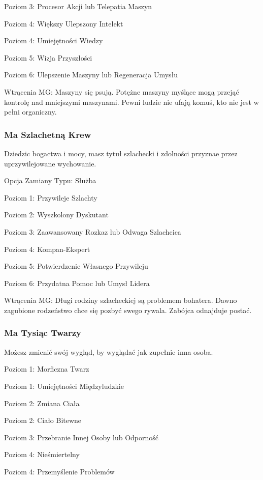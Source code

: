 Poziom 3: Procesor Akcji lub Telepatia Maszyn

Poziom 4: Większy Ulepszony Intelekt

Poziom 4: Umiejętności Wiedzy

Poziom 5: Wizja Przyszłości

Poziom 6: Ulepszenie Maszyny lub Regeneracja Umysłu

Wtrącenia MG: Maszyny się psują. Potężne maszyny myślące mogą przejąć kontrolę nad mniejszymi maszynami. Pewni ludzie nie ufają komuś, kto nie jest w pełni organiczny. 

\subsubsection{Ma Szlachetną Krew}

Dziedzic bogactwa i mocy, masz tytuł szlachecki i zdolności przyznae przez uprzywilejowane wychowanie. 

Opcja Zamiany Typu: Służba

Poziom 1: Przywileje Szlachty

Poziom 2: Wyszkolony Dyskutant

Poziom 3: Zaawansowany Rozkaz lub Odwaga Szlachcica

Poziom 4: Kompan-Ekspert

Poziom 5: Potwierdzenie Własnego Przywileju

Poziom 6: Przydatna Pomoc lub Umysł Lidera

Wtrącenia MG: Długi rodziny szlacheckiej są problemem bohatera. Dawno zagubione rodzeństwo chce się pozbyć swego rywala. Zabójca odnajduje postać. 

\subsubsection{Ma Tysiąc Twarzy}

Możesz zmienić swój wygląd, by wyglądać jak zupełnie inna osoba. 

Poziom 1: Morficzna Twarz

Poziom 1: Umiejętności Międzyludzkie

Poziom 2: Zmiana Ciała

Poziom 2: Ciało Bitewne

Poziom 3: Przebranie Innej Osoby lub Odporność

Poziom 4: Nieśmiertelny

Poziom 4: Przemyślenie Problemów

